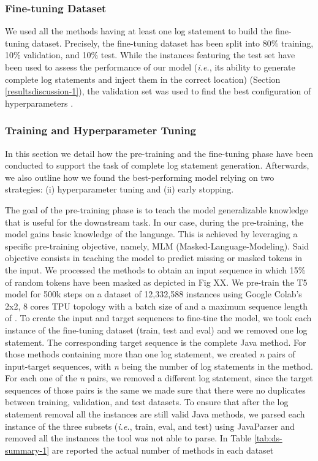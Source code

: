 \subsubsection{Fine-tuning Dataset}
We used all the methods having at least one log statement to build the fine-tuning dataset.
Precisely, the fine-tuning dataset has been split into 80\% training, 10\% validation, and 10\% test. While the instances featuring the test set have been used to assess the performance of our model (\emph{i.e.}, its ability to generate complete log statements and inject them in the correct location) (Section \ref{resultsdiscussion-1}), the validation set was used to find the best configuration of hyperparameters .


\subsubsection{Training and Hyperparameter Tuning} \label{training}
In this section we detail how the pre-training and the fine-tuning phase have been conducted to support the task of complete log statement generation. Afterwards, we also outline how we found the best-performing model relying on two strategies: (i) hyperparameter tuning  and (ii) early stopping.

The goal of the pre-training phase is to teach the model generalizable knowledge that is useful for the downstream task.
In our case, during the pre-training, the model gains basic knowledge of the \java language. This is achieved by leveraging a specific pre-training objective, namely, MLM (Masked-Language-Modeling). Said objective consists in teaching the model to predict missing or masked tokens in the input. We processed the methods to obtain an input sequence in which 15\% of random tokens have been masked as depicted in Fig XX.
We pre-train the T5 model for 500k steps on a dataset of 12,332,588 instances using Google Colab's 2x2, 8 cores TPU topology with a batch size of  and a maximum sequence length of . 
To create the input and target sequences to fine-tine the model, we took each instance of the fine-tuning dataset (\ie train, test and eval) and we removed one log statement. The corresponding target sequence is the complete Java method.
For those methods containing more than one log statement, we created \emph{n} pairs of input-target sequences, with \emph{n} being the number of log statements in the method.
For each one of the \emph{n} pairs, we removed a different log statement, since the target sequences of those pairs is the same we made sure that there were no duplicates between training, validation, and test datasets. 
To ensure that after the log statement removal all the instances are still valid Java methods, we parsed each instance of the three subsets (\emph{i.e.}, train, eval, and test) using JavaParser \cite{javaparser} and removed all the instances the tool was not able to parse.
In Table \ref{tab:ds-summary-1} are reported the actual number of methods in each dataset



